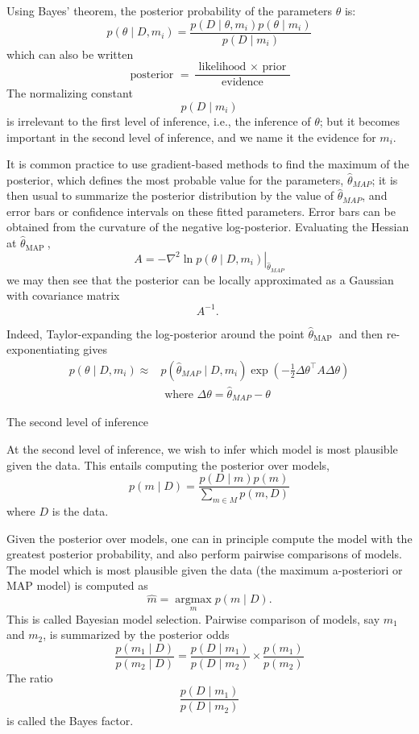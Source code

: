 \documentclass[11pt]{article}
\theoremstyle{plain} %
\theoremstyle{remark}
\begin{document}
Using Bayes' theorem, the posterior probability of the parameters
  $\theta$ is:
$$
p\left(\theta \mid D, m_{i}\right)=\frac{p\left(D \mid \theta, m_{i}\right) p\left(\theta \mid m_{i}\right)}{p\left(D \mid m_{i}\right)}
$$
which can also be written
$$
\text { posterior }=\frac{\text { likelihood } \times \text { prior }}{\text { evidence }}
$$
The normalizing constant 
$$
p\left(D \mid m_{i}\right)
$$
is irrelevant to the first level of inference, i.e., the inference of $\theta$;
but it becomes important in the second level of inference, and we name it the
evidence for $m_{i}$.

It is common practice to use gradient-based methods to find the maximum
  of the posterior, which defines the most probable value for the parameters,
  $\hat{\theta}_{M A P}$; it is then usual to summarize the posterior
  distribution by the value of $\hat{\theta}_{M A P}$, and error bars or
  confidence intervals on these fitted parameters. Error bars can be obtained from the curvature of the negative
  log-posterior. Evaluating the Hessian at $\hat{\theta}_{\text {MAP }}$,
$$
A=-\left.\nabla^{2} \ln p\left(\theta \mid D, m_{i}\right)\right|_{\hat{\theta}_{M A P}}
$$
we may then see that the posterior can be locally approximated as a Gaussian
with covariance matrix
$$
A^{-1} \text {. }
$$

Indeed, Taylor-expanding the log-posterior around the point
  $\hat{\theta}_{\text {MAP }}$ and then re-exponentiating gives
$$
\begin{aligned}
p\left(\theta \mid D, m_{i}\right) \approx & p\left(\hat{\theta}_{M A P} \mid D, m_{i}\right) \exp \left(-\frac{1}{2} \Delta \theta^\top A \Delta \theta\right) \\
& \text { where } \Delta \theta=\hat{\theta}_{M A P}-\theta
\end{aligned}
$$

The second level of inference

At the second level of inference, we wish to infer which model is most
  plausible given the data. This entails computing the posterior over models,
$$
p(m \mid D)=\frac{p(D \mid m) p(m)}{\sum_{m \in M} p(m, D)}
$$
where $D$ is the data.

Given the posterior over models, one can in principle compute the model
  with the greatest posterior probability, and also perform pairwise comparisons
  of models. The model which is most plausible given the data (the maximum
  a-posteriori or MAP model) is computed as
$$
\hat{m}=\underset{m}{\operatorname{argmax}} p(m \mid D) .
$$
This is called Bayesian model selection. Pairwise comparison of models, say $m_{1}$ and $m_{2}$, is summarized by
  the posterior odds
$$
\frac{p\left(m_{1} \mid D\right)}{p\left(m_{2} \mid D\right)}=\frac{p\left(D \mid m_{1}\right)}{p\left(D \mid m_{2}\right)} \times \frac{p\left(m_{1}\right)}{p\left(m_{2}\right)}
$$
The ratio
$$
\frac{p\left(D \mid m_{1}\right)}{p\left(D \mid m_{2}\right)}
$$
is called the Bayes factor.
\end{document}
